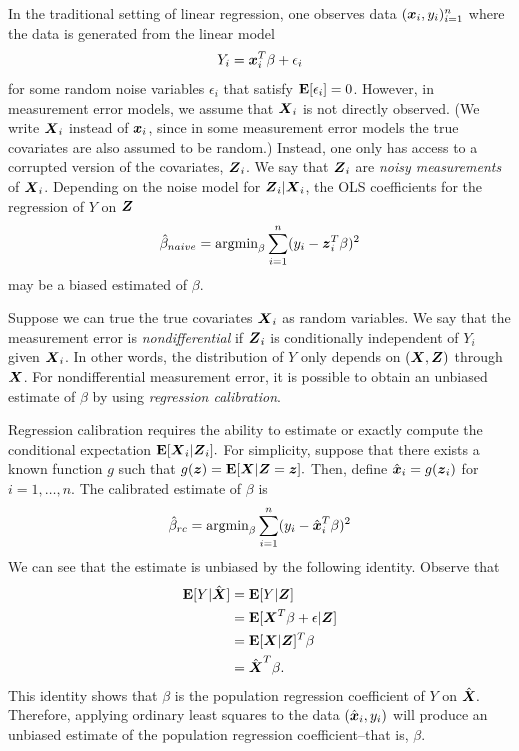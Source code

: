 \documentclass[12pt]{article}
\begin{document}
In the traditional setting of linear regression, one observes data
$(\boldsymbol{x}_i, y_i)_{i=1}^n$ where the data is generated from the linear model
\[
Y_i = \boldsymbol{x}_i^T \beta + \epsilon_i
\]
for some random noise variables $\epsilon_i$ that satisfy
$\textbf{E}[\epsilon_i] = 0$.  However, in measurement error models, we assume
that $\boldsymbol{X}_i$ is not directly observed.  (We write $\boldsymbol{X}_i$ instead of
$\boldsymbol{x}_i$, since in some measurement error models the true covariates
are also assumed to be random.)  Instead, one only has access to a
corrupted version of the covariates, $\boldsymbol{Z}_i$.  We say that $\boldsymbol{Z}_i$
are \emph{noisy measurements} of $\boldsymbol{X}_i$.  Depending on the noise
model for $\boldsymbol{Z}_i|\boldsymbol{X}_i$, the OLS coefficients for the regression of
$Y$ on $\boldsymbol{Z}$
\begin{equation}\label{eq:ols}
\hat{\beta}_{naive} = \text{argmin}_\beta \sum_{i=1}^n (y_i - \boldsymbol{z}_i^T \beta)^2
\end{equation}
may be a biased estimated of $\beta.$

Suppose we can true the true covariates $\boldsymbol{X}_i$ as random variables.
We say that the measurement error is \emph{nondifferential} if $\boldsymbol{Z}_i$
is conditionally independent of $Y_i$ given $\boldsymbol{X}_i$.  In other words,
the distribution of $Y$ only depends on $(\boldsymbol{X}, \boldsymbol{Z})$ through $\boldsymbol{X}$.
For nondifferential measurement error, it is possible to obtain an
unbiased estimate of $\beta$ by using \emph{regression calibration}.

Regression calibration requires the ability to estimate or exactly
compute the conditional expectation $\textbf{E}[\boldsymbol{X}_i|\boldsymbol{Z}_i].$ For simplicity,
suppose that there exists a known function $g$ such that $g(\boldsymbol{z})
= \textbf{E}[\boldsymbol{X}|\boldsymbol{Z} = \boldsymbol{z}].$ Then, define $\hat{\boldsymbol{x}}_i = g(\boldsymbol{z}_i)$ for $i =
1,\hdots, n$.  The calibrated estimate of $\beta$ is
\begin{equation}\label{eq:rc}
\hat{\beta}_{rc} = \text{argmin}_\beta \sum_{i=1}^n (y_i - \hat{\boldsymbol{x}}_i^T \beta)^2
\end{equation}
We can see that the estimate is unbiased by the following identity.
Observe that
\begin{align*}
\textbf{E}[Y|\hat{\boldsymbol{X}}] &= \textbf{E}[Y|\boldsymbol{Z}]
\\&= \textbf{E}[\boldsymbol{X}^T \beta + \epsilon|\boldsymbol{Z}]
\\&= \textbf{E}[\boldsymbol{X}|\boldsymbol{Z}]^T \beta
\\&= \hat{\boldsymbol{X}}^T \beta.
\end{align*}
This identity shows that $\beta$ is the population regression
coefficient of $Y$ on $\hat{\boldsymbol{X}}.$ Therefore, applying ordinary least
squares to the data $(\hat{\boldsymbol{x}}_i, y_i)$ will produce an unbiased
estimate of the population regression coefficient--that is, $\beta.$
\end{document}
